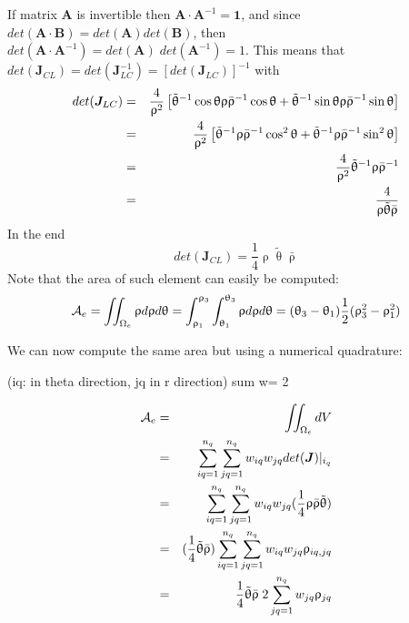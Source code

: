 If matrix ${\bm A}$ is invertible then ${\bm A}\cdot {\bm A}^{-1}={\bm 1}$, 
and since $det({\bm A}\cdot {\bm B}) = det({\bm A}) det ({\bm B})$, then
$det({\bm A}\cdot {\bm A}^{-1})= det({\bm A})\; det ({\bm A}^{-1}) =1$.
This means that 
$
det({\bm J}_{CL})=
det({\bm J}_{LC}^{-1})=
[det({\bm J}_{LC})]^{-1}
$
with 
\begin{eqnarray}
det({\bm J}_{LC})
&=&
\frac{4}{\uprho^2}
\left[
\tilde{\uptheta}^{-1} \cos\uptheta 
 \uprho \bar{\uprho}^{-1} \cos \uptheta+ 
\tilde{\uptheta}^{-1} \sin\uptheta 
\uprho \bar{\uprho}^{-1} \sin \uptheta \right] \nonumber\\
&=&
\frac{4}{\uprho^2}
\left[
\tilde{\uptheta}^{-1} 
 \uprho \bar{\uprho}^{-1} \cos^2 \uptheta+ 
\tilde{\uptheta}^{-1}  
\uprho \bar{\uprho}^{-1} \sin^2 \uptheta \right] \nonumber\\
&=&
\frac{4}{\uprho^2}
\tilde{\uptheta}^{-1} \uprho \bar{\uprho}^{-1} \nonumber\\
&=&
\frac{4}{\uprho \tilde{\uptheta}  \bar{\uprho}}
\end{eqnarray}
In the end 
\[
det({\bm J}_{CL})= \frac14 \uprho \tilde{\uptheta}  \bar{\uprho}
\]
Note that the area of such element can easily be computed:
\[
{\cal A}_e 
= \iint_{\Omega_e} \uprho d\uprho d\uptheta 
= \int_{\uprho_1}^{\uprho_3}\int_{\uptheta_1}^{\uptheta_3} \uprho d\uprho d\uptheta 
= (\uptheta_3-\uptheta_1) \frac12 (\uprho_3^2-\uprho_1^2)
\]

We can now compute the same area but using a numerical quadrature:


(iq: in theta direction, jq in r direction) sum w= 2

\begin{eqnarray}
{\cal A}_e
&=&\iint_{\Omega_e} dV  \nonumber\\
&=&\sum_{iq=1}^{n_q} \sum_{jq=1}^{n_q}   w_{iq} w_{jq} det({\bm J})|_{i_q} \nonumber\\
&=&\sum_{iq=1}^{n_q} \sum_{jq=1}^{n_q}   w_{iq} w_{jq} (\frac14 \uprho \bar{\uprho} \tilde{\uptheta} ) \nonumber\\
&=&(\frac14 \tilde{\uptheta} \bar{\uprho})  \sum_{iq=1}^{n_q} \sum_{jq=1}^{n_q}   w_{iq} w_{jq} \uprho_{iq,jq} \nonumber\\
&=&\frac14 \tilde{\uptheta}   \bar{\uprho} \;  2  \sum_{jq=1}^{n_q}  w_{jq} \uprho_{jq} 
\end{eqnarray}

